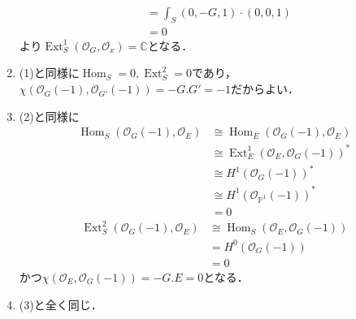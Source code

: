 \documentclass[uplatex,a4paper,11pt,dvipdfmx]{jsarticle}
\makeatletter
\theoremstyle{mystyle} %
\renewenvironment{proof}[1][\proofname]{\par
 \pushQED{\qed}%
 \normalfont \topsep6\p@\@plus6\p@\relax
 \trivlist
 \item[\hskip\labelsep
 \itshape
 {\bf\underline{#1}}]\ignorespaces
}{%
 \popQED\endtrivlist\@endpefalse
}
\DeclareMathOperator{\Hom}{Hom}
\DeclareMathOperator{\Ext}{Ext}
\makeatother
\begin{document}
\begin{proof}
\begin{enumerate}
\begin{align*}
			                                         & =\int_S (0, -G, 1)\cdot(0, 0, 1)                                     \\
			                                         & =0
		      \end{align*}
		      より$\Ext^1_S(\mathcal{O}_G, \mathcal{O}_x) = \mathbb{C}$となる．
		\item (1)と同様に$\Hom_S=0, \Ext^2_S = 0$であり，$\chi(\mathcal{O}_G(-1), \mathcal{O}_{G'}(-1)) =-G.G' = -1$だからよい．
		\item (2)と同様に\begin{align*}
			      \Hom_S(\mathcal{O}_G(-1), \mathcal{O}_E) & \cong \Hom_E(\mathcal{O}_G(-1),\mathcal{O}_E)      \\
			                                               & \cong \Ext^1_E(\mathcal{O}_E, \mathcal{O}_G(-1))^* \\
			                                               & \cong H^1(\mathcal{O}_G(-1))^*                     \\
			                                               & \cong H^1(\mathcal{O}_{\mathbb{P}^1}(-1))^*        \\
			                                               & =0
		      \end{align*}
		      \begin{align*}
			      \Ext^2_S(\mathcal{O}_G(-1), \mathcal{O}_E) & \cong \Hom_S(\mathcal{O}_E, \mathcal{O}_G(-1)) \\
			                                                 & =H^0(\mathcal{O}_G(-1))                        \\
			                                                 & =0
		      \end{align*}
		      かつ$\chi(\mathcal{O}_E, \mathcal{O}_G(-1)) = -G.E = 0$となる．
		\item (3)と全く同じ．
	\end{enumerate}
\end{proof}
\end{document}
